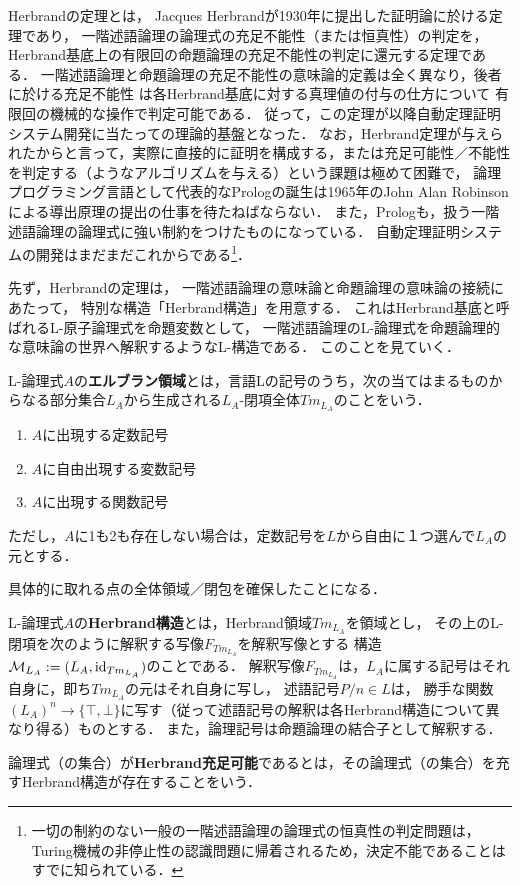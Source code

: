 \documentclass[uplatex, 12pt, dvipdfmx]{jsreport}
\begin{document}
Herbrandの定理とは，
Jacques Herbrandが1930年に提出した証明論に於ける定理であり，
一階述語論理の論理式の充足不能性（または恒真性）の判定を，Herbrand基底上の有限回の命題論理の充足不能性の判定に還元する定理である．
一階述語論理と命題論理の充足不能性の意味論的定義は全く異なり，後者に於ける充足不能性
は各Herbrand基底に対する真理値の付与の仕方について
有限回の機械的な操作で判定可能である．
従って，この定理が以降自動定理証明システム開発に当たっての理論的基盤となった．
なお，Herbrand定理が与えられたからと言って，実際に直接的に証明を構成する，または充足可能性／不能性を判定する（ようなアルゴリズムを与える）という課題は極めて困難で，
論理プログラミング言語として代表的なPrologの誕生は1965年のJohn Alan Robinsonによる導出原理の提出の仕事を待たねばならない．
また，Prologも，扱う一階述語論理の論理式に強い制約をつけたものになっている．
自動定理証明システムの開発はまだまだこれからである\footnote{一切の制約のない一般の一階述語論理の論理式の恒真性の判定問題は，Turing機械の非停止性の認識問題に帰着されるため，決定不能であることはすでに知られている．}．

先ず，Herbrandの定理は，
一階述語論理の意味論と命題論理の意味論の接続にあたって，
特別な構造「Herbrand構造」を用意する．
これはHerbrand基底と呼ばれるL-原子論理式を命題変数として，
一階述語論理のL-論理式を命題論理的な意味論の世界へ解釈するようなL-構造である．
このことを見ていく．

\begin{definition}
    L-論理式$A$の\textbf{エルブラン領域}とは，言語Lの記号のうち，次の当てはまるものからなる部分集合$L_A$から生成される$L_A$-閉項全体$Tm_{L_A}$のことをいう．
    \begin{enumerate}
        \item $A$に出現する定数記号
        \item $A$に自由出現する変数記号
        \item $A$に出現する関数記号
    \end{enumerate}
    ただし，$A$に1も2も存在しない場合は，定数記号を$L$から自由に１つ選んで$L_A$の元とする．
\end{definition}
\begin{remark}
    具体的に取れる点の全体領域／閉包を確保したことになる．
\end{remark}

\begin{definition}
    L-論理式$A$の\textbf{Herbrand構造}とは，Herbrand領域$Tm_{L_A}$を領域とし，
    その上のL-閉項を次のように解釈する写像$F_{Tm_{L_A}}$を解釈写像とする
    構造$\mathcal{M}_{L_A}:=(L_A,\mathrm{id}_{Tm_{L_A}})$のことである．
    解釈写像$F_{Tm_{L_A}}$は，$L_A$に属する記号はそれ自身に，即ち$Tm_{L_A}$の元はそれ自身に写し，
    述語記号$P/n\in L$は，
    勝手な関数$(L_A)^n\to\{\top,\bot\}$に写す（従って述語記号の解釈は各Herbrand構造について異なり得る）ものとする．
    また，論理記号は命題論理の結合子として解釈する．
\end{definition}
\begin{definition}
    論理式（の集合）が\textbf{Herbrand充足可能}であるとは，その論理式（の集合）を充すHerbrand構造が存在することをいう．
\end{definition}
\end{document}
